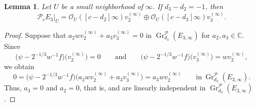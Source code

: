 \documentclass[pdftex]{sigma}
\numberwithin{equation}{section}
\newtheorem{Lemma}[Theorem]{Lemma}
\newcommand{\C}{\mathbb{C}}
\newcommand{\gr}{\operatorname{\mathrm{Gr}}}
\begin{document}
\begin{Lemma}%
 Let $U$ be a small neighborhood of $\infty$. If $d_3-d_2=-1$, then
 \begin{equation*}
 \mathcal{P}_{c}E_3|_{U} = \mathcal{O}_U([c-d_2]\infty)v^{(\infty)}_2 \oplus \mathcal{O}_U([c-d_3]\infty)v^{(\infty)}_3.
 \end{equation*}
\end{Lemma}
\begin{proof}
 Suppose that $a_2wv^{(\infty)}_2+a_3v^{(\infty)}_3=0$ in $\gr^{\mathcal{P}}_{d_3}(E_{3,\infty})$ for $a_2,a_3\in\C$.
Since
 \[
 \big(\psi-2^{-1/3}w^{-1}f\big)\big(v^{(\infty)}_2\big)=0 \qquad \text{and} \qquad \big(\psi-2^{-1/3}w^{-1}f\big)\big(v^{(\infty)}_3\big)=wv^{(\infty)}_2,
 \]
 we obtain
 \begin{equation*}
 0 = \big(\psi-2^{-1/3}w^{-1}f\big)\big(a_2wv^{(\infty)}_2+a_3v^{(\infty)}_3\big) = a_3wv^{(\infty)}_2\qquad \text{in}\ \gr^{\mathcal{P}}_{d_3}(E_{3,\infty}).
 \end{equation*}
 Thus, $a_3=0$ and $a_2=0$, that is,  and  are linearly independent in $\gr^{\mathcal{P}}_{d_3}(E_{3,\infty})$.
\end{proof}
\end{document}
